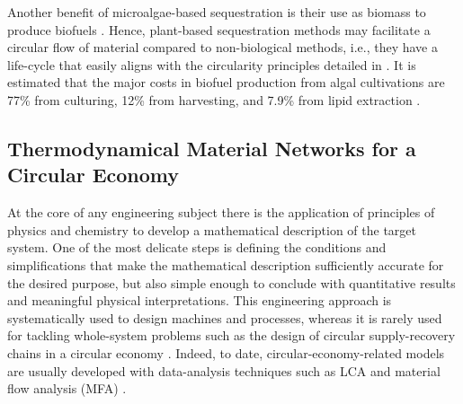 \documentclass[lettersize,journal]{IEEEtran}
\begin{document}
Another benefit of microalgae-based sequestration is their use as biomass to produce biofuels \cite{arun2021technical}. Hence, plant-based sequestration methods may facilitate a circular flow of material compared to non-biological methods, i.e., they have a life-cycle that easily aligns with the circularity principles detailed in \cite{suarez2019operational}. It is estimated that the major costs in biofuel production from algal cultivations are 77\% from culturing, 12\% from harvesting, and 7.9\% from lipid extraction \cite{sarwer2022algal}.   


 

     





\subsection{Thermodynamical Material Networks for a Circular Economy}
At the core of any engineering subject there is the application of principles of physics and chemistry to develop a mathematical description of the target system. One of the most delicate steps is defining the conditions and simplifications that make the mathematical description sufficiently accurate for the desired purpose, but also simple enough to conclude with quantitative results and meaningful physical interpretations. This engineering approach is systematically used to design machines and processes, whereas it is rarely used for tackling whole-system problems such as the design of circular supply-recovery chains in a circular economy \cite{EMAFund}. Indeed, to date, circular-economy-related models are usually developed with data-analysis techniques such as LCA \cite{amicarelli2022life,walker2020life,xia2022review,cucurachi2019life,sala2021evolution} and material flow analysis (MFA) \cite{luan2021dynamic,li2022uncovering,sieber2020dynamic,liu2021dynamic,eriksen2020dynamic}. 
\end{document}
